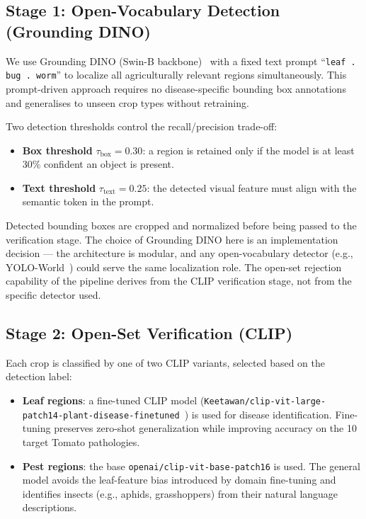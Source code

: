 \documentclass[runningheads]{llncs}
\begin{document}
\subsection{Stage 1: Open-Vocabulary Detection (Grounding DINO)}
\label{subsec:gdino}

We use Grounding DINO (Swin-B backbone)~\cite{liu2023grounding} with a fixed text prompt ``\texttt{leaf . bug . worm}'' to localize all agriculturally relevant regions simultaneously. This prompt-driven approach requires no disease-specific bounding box annotations and generalises to unseen crop types without retraining.

Two detection thresholds control the recall/precision trade-off:
\begin{itemize}
    \item \textbf{Box threshold} $\tau_{\text{box}} = 0.30$: a region is retained only if the model is at least 30\% confident an object is present.
    \item \textbf{Text threshold} $\tau_{\text{text}} = 0.25$: the detected visual feature must align with the semantic token in the prompt.
\end{itemize}

Detected bounding boxes are cropped and normalized before being passed to the verification stage. The choice of Grounding DINO here is an implementation decision --- the architecture is modular, and any open-vocabulary detector (e.g., YOLO-World~\cite{wang2024yoloworld}) could serve the same localization role. The open-set rejection capability of the pipeline derives from the CLIP verification stage, not from the specific detector used.

\subsection{Stage 2: Open-Set Verification (CLIP)}
\label{subsec:clip}

Each crop is classified by one of two CLIP variants, selected based on the detection label:

\begin{itemize}
    \item \textbf{Leaf regions}: a fine-tuned CLIP model (\texttt{Keetawan/clip-vit-large-patch14-plant-disease-finetuned}~\cite{keetawan2024plantdisease}) is used for disease identification. Fine-tuning preserves zero-shot generalization while improving accuracy on the 10 target Tomato pathologies.
    \item \textbf{Pest regions}: the base \texttt{openai/clip-vit-base-patch16} is used. The general model avoids the leaf-feature bias introduced by domain fine-tuning and identifies insects (e.g., aphids, grasshoppers) from their natural language descriptions.
\end{itemize}
\end{document}
